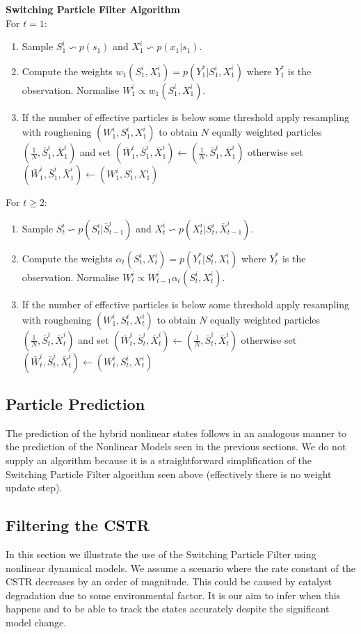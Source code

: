 \documentclass[../masters.tex]{subfiles}
\begin{document}
\textbf{Switching Particle Filter Algorithm}\\
For $t=1$:
\begin{enumerate}
\item
Sample $S^i_1 \backsim p(s_1)$ and $X^i_1 \backsim p(x_1|s_1)$.
\item
Compute the weights $w_1(S_1^i, X_1^i) = p(Y^*_1|S_1^i, X_1^i)$ where $Y^*_1$ is the observation. Normalise $W^i_1 \propto w_1(S_1^i, X_1^i)$. 
\item
If the number of effective particles is below some threshold apply resampling with roughening $(W^i_1, S^i_1, X^i_1)$ to obtain $N$ equally weighted particles $(\frac{1}{N}, \bar{S}^i_1, \bar{X}^i_1)$ and set $(\bar{W}^i_1, \bar{S}^i_1,\bar{X}^i_1) \leftarrow (\frac{1}{N}, \bar{S}^i_1, \bar{X}^i_1)$ otherwise set $(\bar{W}^i_1,\bar{S}^i_1, \bar{X}^i_1) \leftarrow ({W}^i_1, S_1^i, {X}^i_1)$
\end{enumerate}
For $t \geq 2$:
\begin{enumerate}
\item
Sample $S^i_t \backsim p(S_t^i|\bar{S}^i_{t-1})$ and $X^i_t \backsim p(X^i_t|S^i_t, \bar{X}^i_{t-1})$.
\item
Compute the weights $\alpha_t(S_t^i, X_t^i) = p(Y^*_t|S_t^i, X_t^i)$ where $Y^*_t$ is the observation. Normalise $W^i_t \propto W^i_{t-1}\alpha_t(S_t^i, X_t^i)$.
\item
If the number of effective particles is below some threshold apply resampling with roughening $(W^i_1, S^i_t, X^i_t)$ to obtain $N$ equally weighted particles $(\frac{1}{N}, \bar{S}^i_t, \bar{X}^i_t)$ and set $(\bar{W}^i_t, \bar{S}^i_t,\bar{X}^i_t) \leftarrow (\frac{1}{N}, \bar{S}^i_t, \bar{X}^i_t)$ otherwise set $(\bar{W}^i_t,\bar{S}^i_t, \bar{X}^i_t) \leftarrow ({W}^i_t, S_t^i, {X}^i_t)$
\end{enumerate} 

\subsection{Particle Prediction}
The prediction of the hybrid nonlinear states follows in an analogous manner to the prediction of the Nonlinear Models seen in the previous sections. We do not supply an algorithm because it is a straightforward simplification of the Switching Particle Filter algorithm seen above (effectively there is no weight update step).  

\subsection{Filtering the CSTR}
In this section we illustrate the use of the Switching Particle Filter using nonlinear dynamical models. We assume a scenario where the rate constant of the CSTR decreases by an order of magnitude. This could be caused by catalyst degradation due to some environmental factor. It is our aim to infer when this happens and to be able to track the states accurately despite the significant model change. 
\end{document}
